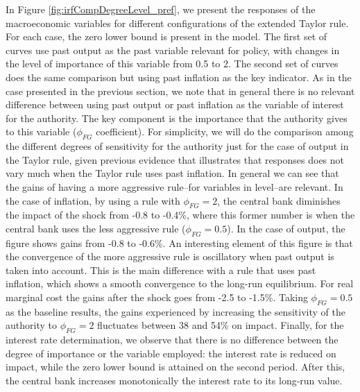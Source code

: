 \documentclass[11pt]{article}
\numberwithin{equation}{section}
\begin{document}
In Figure \ref{fig:irfCompDegreeLevel_pref}, we present the responses of the macroeconomic variables for different configurations of the extended Taylor rule. For each case, the zero lower bound is present in the model. The first set of curves use past output as the past variable relevant for policy, with changes in the level of importance of this variable from 0.5 to 2. The second set of curves does the same comparison but using past inflation as the key indicator. As in the case presented in the previous section, we note that in general there is no relevant difference between using past output or past inflation as the variable of interest for the authority. The key component is the importance that the authority gives to this variable ($\phi_{FG}$ coefficient). For simplicity, we will do the comparison among the different degrees of sensitivity for the authority just for the case of output in the Taylor rule, given previous evidence that illustrates that responses does not vary much when the Taylor rule uses past inflation. In general we can see that the gains of having a more aggressive rule--for variables in level--are relevant. In the case of inflation, by using a rule with $\phi_{FG}=2$, the central bank diminishes the impact of the shock from -0.8 to -0.4\%, where this former number is when the central bank uses the less aggressive rule ($\phi_{FG}=0.5$). In the case of output, the figure shows gains from -0.8 to -0.6\%. An interesting element of this figure is that the convergence of the more aggressive rule is oscillatory when past output is taken into account. This is the main difference with a rule that uses past inflation, which shows a smooth convergence to the long-run equilibrium. For real marginal cost the gains after the shock goes from -2.5 to -1.5\%. Taking $\phi_{FG}=0.5$ as the baseline results, the gains experienced by increasing the sensitivity of the authority to $\phi_{FG}=2$ fluctuates between 38 and 54\% on impact. Finally, for the interest rate determination, we observe that there is no difference between the degree of importance or the variable employed: the interest rate is reduced on impact, while the zero lower bound is attained on the second period. After this, the central bank increases monotonically the interest rate to its long-run value. 
\end{document}
